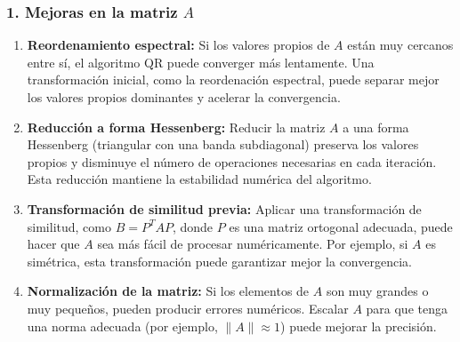 \subsubsection{1. Mejoras en la matriz \( A \)}
\begin{enumerate}
    \item \textbf{Reordenamiento espectral:}
    Si los valores propios de \( A \) están muy cercanos entre sí, el algoritmo QR puede converger más lentamente. Una transformación inicial, como la reordenación espectral, puede separar mejor los valores propios dominantes y acelerar la convergencia.

    \item \textbf{Reducción a forma Hessenberg:}
    Reducir la matriz \( A \) a una forma Hessenberg (triangular con una banda subdiagonal) preserva los valores propios y disminuye el número de operaciones necesarias en cada iteración. Esta reducción mantiene la estabilidad numérica del algoritmo.

    \item \textbf{Transformación de similitud previa:}
    Aplicar una transformación de similitud, como \( B = P^T A P \), donde \( P \) es una matriz ortogonal adecuada, puede hacer que \( A \) sea más fácil de procesar numéricamente. Por ejemplo, si \( A \) es simétrica, esta transformación puede garantizar mejor la convergencia.

    \item \textbf{Normalización de la matriz:}
    Si los elementos de \( A \) son muy grandes o muy pequeños, pueden producir errores numéricos. Escalar \( A \) para que tenga una norma adecuada (por ejemplo, \( \|A\| \approx 1 \)) puede mejorar la precisión.

\end{enumerate}

